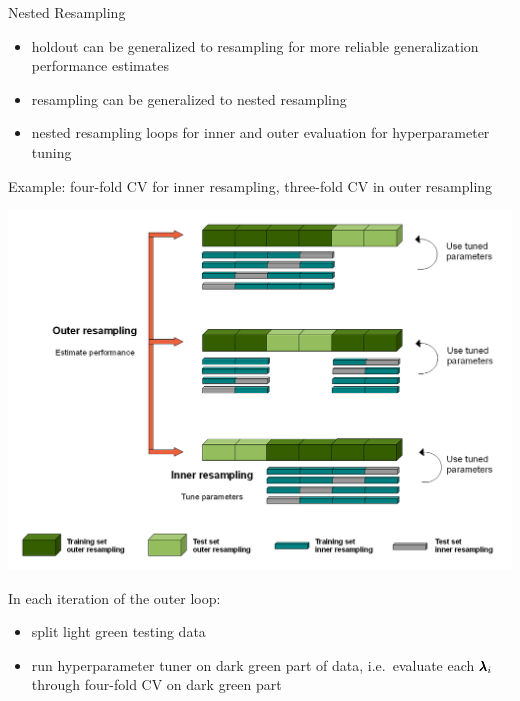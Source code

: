     \begin{frame}[c,allowframebreaks]{Nested Resampling}

        \begin{itemize}
            \item holdout can be generalized to resampling for more reliable
                generalization performance estimates
            \item resampling can be generalized to nested resampling
            \item nested resampling loops for inner and outer evaluation for
                hyperparameter tuning
        \end{itemize}

    \framebreak

    Example: four-fold CV for inner resampling, three-fold CV in outer
    resampling

    \begin{center}
        \includegraphics[height=0.6\textheight]{Nested_Resampling.png}
    \end{center}

    \framebreak

    \begin{footnotesize}
    In each iteration of the outer loop:
    \begin{itemize}
    \item split light green testing data
    \item run hyperparameter tuner on dark green part of data, i.e.\
      evaluate each $\pmb{\lambda}_i$ through four-fold CV on dark green part
    \end{itemize}
    \end{footnotesize}


\end{frame}
